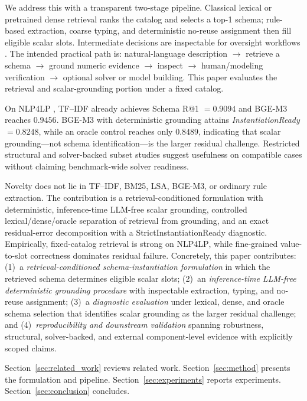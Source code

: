\documentclass[pdflatex,sn-basic,Numbered]{sn-jnl}
\begin{document}
We address this with a transparent two-stage pipeline. Classical lexical or pretrained dense retrieval ranks the catalog and selects a top-1 schema; rule-based extraction, coarse typing, and deterministic no-reuse assignment then fill eligible scalar slots. Intermediate decisions are inspectable for oversight workflows \cite{biemans2025explainableoptimization,powell2025scheduling_explanations}. The intended practical path is: natural-language description $\rightarrow$ retrieve a schema $\rightarrow$ ground numeric evidence $\rightarrow$ inspect $\rightarrow$ human/modeling verification $\rightarrow$ optional solver or model building. This paper evaluates the retrieval and scalar-grounding portion under a fixed catalog.

On \textsc{NLP4LP} \cite{nlp4lp_dataset,ahmaditeshnizi2024optimus_icml}, TF--IDF already achieves Schema R@1 $=0.9094$ and BGE-M3 reaches $0.9456$. BGE-M3 with deterministic grounding attains \textit{InstantiationReady} $=0.8248$, while an oracle control reaches only $0.8489$, indicating that scalar grounding---not schema identification---is the larger residual challenge. Restricted structural and solver-backed subset studies suggest usefulness on compatible cases without claiming benchmark-wide solver readiness.

Novelty does not lie in TF--IDF, BM25, LSA, BGE-M3, or ordinary rule extraction. The contribution is a retrieval-conditioned formulation with deterministic, inference-time LLM-free scalar grounding, controlled lexical/dense/oracle separation of retrieval from grounding, and an exact residual-error decomposition with a StrictInstantiationReady diagnostic. Empirically, fixed-catalog retrieval is strong on \textsc{NLP4LP}, while fine-grained value-to-slot correctness dominates residual failure. Concretely, this paper contributes:
\label{subsec:intro_contributions}
(1)~a \emph{retrieval-conditioned schema-instantiation formulation} in which the retrieved schema determines eligible scalar slots; (2)~an \emph{inference-time LLM-free deterministic grounding procedure} with inspectable extraction, typing, and no-reuse assignment; (3)~a \emph{diagnostic evaluation} under lexical, dense, and oracle schema selection that identifies scalar grounding as the larger residual challenge; and (4)~\emph{reproducibility and downstream validation} spanning robustness, structural, solver-backed, and external component-level evidence with explicitly scoped claims.

Section~\ref{sec:related_work} reviews related work. Section~\ref{sec:method} presents the formulation and pipeline. Section~\ref{sec:experiments} reports experiments. Section~\ref{sec:conclusion} concludes.
\end{document}
